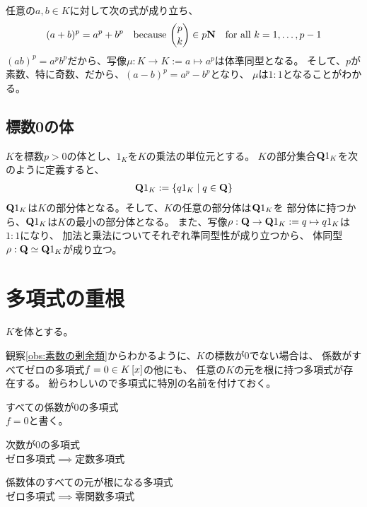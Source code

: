 {	任意の$a,b\in K$に対して次の式が成り立ち、
	\begin{equation*}\begin{split}
		(a + b)^p = a^p + b^p \quad\text{because }
		\binom{p}{k}\in p\mathbf{N}  \quad\text{for all } k=1,\dots,p-1
	\end{split}\end{equation*}
	$(ab)^p=a^pb^p$だから、写像$\mu:K\to K:=a\mapsto a^p$は体準同型となる。
	そして、$p$が素数、特に奇数、だから、$(a-b)^p=a^p-b^p$となり、
	$\mu$は$1:1$となることがわかる。
\subsection{標数0の体}\label{s2:標数0の体} %
	$K$を標数$p>0$の体とし、$1_K$を$K$の乗法の単位元とする。
	$K$の部分集合$\mathbf{Q}1_K$を次のように定義すると、
	\begin{equation*}\begin{split}
		\mathbf{Q}1_K:=\mathinner{\{{q1_K\mid q\in\ensuremath{\mathbf{Q}}}\}}
	\end{split}\end{equation*}
	$\mathbf{Q}1_K$は$K$の部分体となる。そして、$K$の任意の部分体は$\mathbf{Q}1_K$を
	部分体に持つから、$\mathbf{Q}1_K$は$K$の最小の部分体となる。
	また、写像$\rho:\mathbf{Q}\to\mathbf{Q}1_K:=q\mapsto q1_K$は$1:1$になり、
	加法と乗法についてそれぞれ準同型性が成り立つから、
	体同型$\rho:\mathbf{Q}\simeq\mathbf{Q}1_K$が成り立つ。
\section{多項式の重根}\label{s1:多項式の重根} %
	$K$を体とする。

	観察\ref{obs:素数の剰余類}からわかるように、$K$の標数が$0$でない場合は、
	係数がすべてゼロの多項式$f=0\in K\mathinner{[{x}]}$の他にも、
	任意の$K$の元を根に持つ多項式が存在する。
	紛らわしいので多項式に特別の名前を付けておく。

	\begin{description}\setlength{\itemsep}{-1mm} %
		\item[ゼロ多項式] すべての係数が$0$の多項式 \\
		$f=0$と書く。
		\item[定数多項式] 次数が$0$の多項式 \\
		ゼロ多項式$\implies$定数多項式
		\item[ゼロ関数多項式] 係数体のすべての元が根になる多項式 \\
		ゼロ多項式$\implies$零関数多項式
	\end{description} %

}
